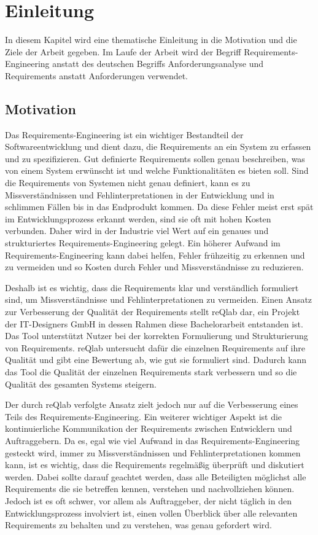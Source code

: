 \chapter{Einleitung}

In diesem Kapitel wird eine thematische Einleitung in die Motivation und die Ziele der Arbeit gegeben.
Im Laufe der Arbeit wird der Begriff Requirements-Engineering anstatt des deutschen Begriffs Anforderungsanalyse und Requirements anstatt Anforderungen verwendet.

\section{Motivation}
\label{section:motivation}

Das Requirements-Engineering ist ein wichtiger Bestandteil der Softwareentwicklung und dient dazu, die Requirements an ein System zu erfassen und zu spezifizieren.
Gut definierte Requirements sollen genau beschreiben, was von einem System erwünscht ist und welche Funktionalitäten es bieten soll.
Sind die Requirements von Systemen nicht genau definiert, kann es zu Missverständnissen und Fehlinterpretationen in der Entwicklung und in schlimmen Fällen bis in das Endprodukt kommen.
Da diese Fehler meist erst spät im Entwicklungsprozess erkannt werden, sind sie oft mit hohen Kosten verbunden.
Daher wird in der Industrie viel Wert auf ein genaues und strukturiertes Requirements-Engineering gelegt.
Ein höherer Aufwand im Requirements-Engineering kann dabei helfen, Fehler frühzeitig zu erkennen und zu vermeiden und so Kosten durch Fehler und Missverständnisse zu reduzieren.

Deshalb ist es wichtig, dass die Requirements klar und verständlich formuliert sind, um Missverständnisse und Fehlinterpretationen zu vermeiden.
Einen Ansatz zur Verbesserung der Qualität der Requirements stellt reQlab dar, ein Projekt der IT-Designers GmbH in dessen Rahmen diese Bachelorarbeit entstanden ist.
Das Tool unterstützt Nutzer bei der korrekten Formulierung und Strukturierung von Requirements.
reQlab untersucht dafür die einzelnen Requirements auf ihre Qualität und gibt eine Bewertung ab, wie gut sie formuliert sind.
Dadurch kann das Tool die Qualität der einzelnen Requirements stark verbessern und so die Qualität des gesamten Systems steigern.

Der durch reQlab verfolgte Ansatz zielt jedoch nur auf die Verbesserung eines Teils des Requirements-Engineering.
Ein weiterer wichtiger Aspekt ist die kontinuierliche Kommunikation der Requirements zwischen Entwicklern und Auftraggebern.
Da es, egal wie viel Aufwand in das Requirements-Engineering gesteckt wird, immer zu Missverständnissen und Fehlinterpretationen kommen kann, ist es wichtig, dass die Requirements regelmäßig überprüft und diskutiert werden.
Dabei sollte darauf geachtet werden, dass alle Beteiligten möglichst alle Requirements die sie betreffen kennen, verstehen und nachvollziehen können.
Jedoch ist es oft schwer, vor allem als Auftraggeber, der nicht täglich in den Entwicklungsprozess involviert ist, einen vollen Überblick über alle relevanten Requirements zu behalten und zu verstehen, was genau gefordert wird.

